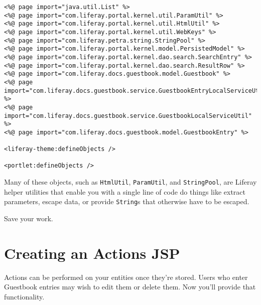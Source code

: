 \begin{enumerate}
\begin{verbatim}
<%@ page import="java.util.List" %>
<%@ page import="com.liferay.portal.kernel.util.ParamUtil" %>
<%@ page import="com.liferay.portal.kernel.util.HtmlUtil" %>
<%@ page import="com.liferay.portal.kernel.util.WebKeys" %>
<%@ page import="com.liferay.petra.string.StringPool" %>
<%@ page import="com.liferay.portal.kernel.model.PersistedModel" %>
<%@ page import="com.liferay.portal.kernel.dao.search.SearchEntry" %>
<%@ page import="com.liferay.portal.kernel.dao.search.ResultRow" %>
<%@ page import="com.liferay.docs.guestbook.model.Guestbook" %>
<%@ page import="com.liferay.docs.guestbook.service.GuestbookEntryLocalServiceUtil" %>
<%@ page import="com.liferay.docs.guestbook.service.GuestbookLocalServiceUtil" %>
<%@ page import="com.liferay.docs.guestbook.model.GuestbookEntry" %>

<liferay-theme:defineObjects />

<portlet:defineObjects />
\end{verbatim}
\end{enumerate}

Many of these objects, such as \texttt{HtmlUtil}, \texttt{ParamUtil},
and \texttt{StringPool}, are Liferay helper utilities that enable you
with a single line of code do things like extract parameters, escape
data, or provide \texttt{String}s that otherwise have to be escaped.

Save your work.

\section{Creating an Actions JSP}\label{creating-an-actions-jsp}

Actions can be performed on your entities once they're stored. Users who
enter Guestbook entries may wish to edit them or delete them. Now you'll
provide that functionality.

